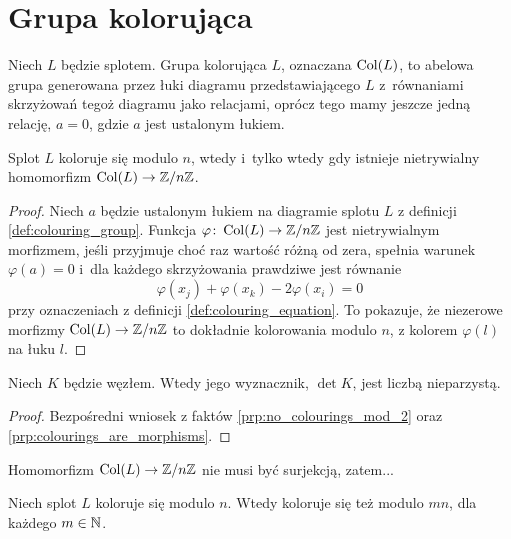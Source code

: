 
\section{Grupa kolorująca}
%

\begin{definition}
\label{def:colouring_group}%
    Niech $L$ będzie splotem.
    Grupa kolorująca $L$, oznaczana $\operatorname{Col}(L)$, to abelowa grupa generowana przez łuki diagramu przedstawiającego $L$ z~równaniami skrzyżowań tegoż diagramu jako relacjami, oprócz tego mamy jeszcze jedną relację, $a = 0$, gdzie $a$ jest ustalonym łukiem.
\end{definition}

\begin{proposition}
\label{prp:colourings_are_morphisms}%
    Splot $L$ koloruje się modulo $n$, wtedy i~tylko wtedy gdy istnieje nietrywialny homomorfizm $\operatorname{Col}(L) \to \mathbb Z/n\mathbb Z$.
\end{proposition}

\begin{proof}
    Niech $a$ będzie ustalonym łukiem na diagramie splotu $L$ z definicji \ref{def:colouring_group}.
    Funkcja $\varphi \colon \operatorname{Col}(L) \to \mathbb Z/n\mathbb Z$ jest nietrywialnym morfizmem, jeśli przyjmuje choć raz wartość różną od zera, spełnia warunek $\varphi(a) = 0$ i~dla każdego skrzyżowania prawdziwe jest równanie
    \begin{equation}
        \varphi(x_j) + \varphi(x_k) - 2\varphi(x_i) = 0
    \end{equation}
    przy oznaczeniach z definicji \ref{def:colouring_equation}.
    To pokazuje, że niezerowe morfizmy $\operatorname{Col}(L) \to \mathbb Z/n\mathbb Z$ to dokładnie kolorowania modulo $n$, z kolorem $\varphi(l)$ na łuku $l$.
\end{proof}

\begin{corollary}
%
\label{cor:knot_determinant_odd}%
    Niech $K$ będzie węzłem.
    Wtedy jego wyznacznik, $\det K$, jest liczbą nieparzystą.
\end{corollary}

\begin{proof}
    Bezpośredni wniosek z faktów \ref{prp:no_colourings_mod_2} oraz \ref{prp:colourings_are_morphisms}.
\end{proof}

Homomorfizm $\operatorname{Col} (L) \to \mathbb Z/n\mathbb Z$ nie musi być surjekcją, zatem...

\begin{proposition}
    Niech splot $L$ koloruje się modulo $n$.
    Wtedy koloruje się też modulo $mn$, dla każdego $m \in \mathbb N$.
\end{proposition}

